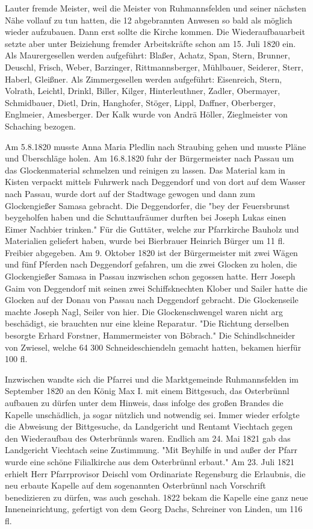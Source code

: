 \documentclass{book}
\begin{document}
Lauter fremde Meister, weil die Meister von Ruhmannsfelden und seiner nächsten
Nähe vollauf zu tun hatten, die 12 abgebrannten Anwesen so bald als möglich
wieder aufzubauen. Dann erst sollte die Kirche kommen. Die Wiederaufbauarbeit
setzte aber unter Beiziehung fremder Arbeitskräfte schon am 15. Juli 1820 ein.
Als Maurergesellen werden aufgeführt: Blaßer, Achatz, Span, Stern, Brunner,
Deuschl, Frisch, Weber, Barzinger, Rittmannsberger, Mühlbauer, Seiderer, Sterr,
Haberl, Gleißner. Als Zimmergesellen werden aufgeführt: Eisenreich, Stern,
Volrath, Leichtl, Drinkl, Biller, Kilger, Hinterleuthner, Zadler, Obermayer,
Schmidbauer, Dietl, Drin, Hanghofer, Stöger, Lippl, Daffner, Oberberger,
Englmeier, Amesberger. Der Kalk wurde von Andrä Höller, Zieglmeister von
Schaching bezogen.

Am 5.8.1820 musste Anna Maria Pledlin nach Straubing gehen und musste Pläne und
Überschläge holen. Am 16.8.1820 fuhr der Bürgermeister nach Passau um das
Glockenmaterial schmelzen und reinigen zu lassen. Das Material kam in Kisten
verpackt mittels Fuhrwerk nach Deggendorf und von dort auf dem Wasser nach
Passau, wurde dort auf der Stadtwage gewogen und dann zum Glockengießer Samasa
gebracht. Die Deggendorfer, die "bey der Feuersbrunst beygeholfen haben und die
Schuttaufräumer durften bei Joseph Lukas einen Eimer Nachbier trinken." Für die
Guttäter, welche zur Pfarrkirche Bauholz und Materialien geliefert haben, wurde
bei Bierbrauer Heinrich Bürger um 11 fl. Freibier abgegeben. Am 9. Oktober 1820
ist der Bürgermeister mit zwei Wägen und fünf Pferden nach Deggendorf gefahren,
um die zwei Glocken zu holen, die Glockengießer Samasa in Passau inzwischen
schon gegossen hatte. Herr Joseph Gaim von Deggendorf mit seinen zwei
Schiffsknechten Klober und Sailer hatte die Glocken auf der Donau von Passau
nach Deggendorf gebracht. Die Glockenseile machte Joseph Nagl, Seiler von hier.
Die Glockenschwengel waren nicht arg beschädigt, sie brauchten nur eine kleine
Reparatur. "Die Richtung derselben besorgte Erhard Forstner, Hammermeister von
Böbrach." Die Schindlschneider von Zwiesel, welche 64 300 Schneideschiendeln
gemacht hatten, bekamen hierfür 100 fl.

Inzwischen wandte sich die Pfarrei und die Marktgemeinde Ruhmannsfelden im
September 1820 an den König Max I. mit einem Bittgesuch, das Osterbrünnl
aufbauen zu dürfen unter dem Hinweis, dass infolge des großen Brandes die
Kapelle unschädlich, ja sogar nützlich und notwendig sei. Immer wieder erfolgte
die Abweisung der Bittgesuche, da Landgericht und Rentamt Viechtach gegen den
Wiederaufbau des Osterbrünnls waren. Endlich am 24. Mai 1821 gab das Landgericht
Viechtach seine Zustimmung. "Mit Beyhilfe in und außer der Pfarr wurde eine
schöne Filialkirche aus dem Osterbrünnl erbaut." Am 23. Juli 1821 erhielt Herr
Pfarrprovisor Deischl vom Ordinariate Regensburg die Erlaubnis, die neu erbaute
Kapelle auf dem sogenannten Osterbrünnl nach Vorschrift benedizieren zu dürfen,
was auch geschah. 1822 bekam die Kapelle eine ganz neue Inneneinrichtung,
gefertigt von dem Georg Dachs, Schreiner von Linden, um 116 fl.
\end{document}

